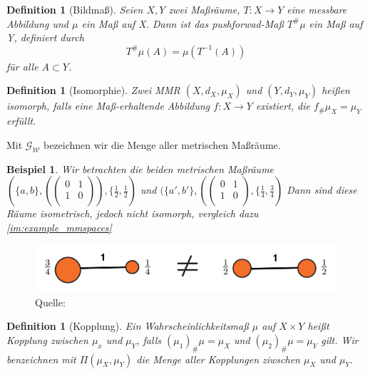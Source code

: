 \documentclass[11pt,a4paper]{article}
\newcommand{\source}[1]{\caption*{\hfill Quelle: {#1}} }
\newtheorem{definition}[theorem]{Definition}
\newtheorem{example}[theorem]{Beispiel}
\numberwithin{equation}{section}
\begin{document}
	\begin{definition}[Bildmaß]
		Seien $X,Y$ zwei Maßräume, $T: X \to Y$ eine messbare Abbildung und $\mu$ ein Maß auf X. Dann ist das pushforwad-Maß $T^\# \mu $ ein Maß auf Y, definiert durch \begin{equation}
		T^\# \mu (A) = \mu (T^{-1}(A))
		\end{equation}
		für alle $A \subset Y$.
	\end{definition}

	\begin{definition}[Isomorphie]
		Zwei MMR $(X,d_X,\mu_X)$ und $(Y,d_Y,\mu_Y)$ heißen isomorph, falls eine Maß-erhaltende Abbildung $f:X \to Y$ existiert, die $f_\#\mu_X = \mu_Y$ erfüllt.
	\end{definition}
	
	Mit $\mathcal{G}_\mathcal{W}$ bezeichnen wir die Menge aller metrischen Maßräume.
	
	\begin{example}
		Wir betrachten die beiden metrischen Maßräume $(\lbrace a,b \rbrace, (\begin{pmatrix}
		0 & 1\\
		1 & 0 \\
		\end{pmatrix}), \lbrace \frac{1}{2},\frac{1}{2})$ und 
		$(\lbrace a',b' \rbrace, (
		\begin{pmatrix}
		0 & 1\\
		1 & 0 \\
		\end{pmatrix}, \lbrace \frac{1}{4},\frac{3}{4})$
		Dann sind diese Räume isometrisch, jedoch nicht isomorph, vergleich dazu \autoref{im:example_mmspaces}
	\end{example}
	
	\begin{figure}[ht]
		\centering
		\includegraphics[width=0.3\textheight]{example_mmspaces.png}
		\caption[Beispiel isometrischer metrischer Maßräume]{Die beiden metrischen Maßräume sind ismetrisch, aber nicht isomorph.}
		\source{\cite{COTcuturi}}
		\label{im:example_mmspaces}
	\end{figure}
	
	
	\begin{definition}[Kopplung]
		Ein Wahrscheinlichkeitsmaß $\mu$ auf $X \times Y$ heißt Kopplung zwischen $\mu_x$ und $\mu_Y$, falls $(\mu_1)_\#\mu = \mu_X$ und $(\mu_2)_\#\mu = \mu_Y$ gilt. Wir benzeichnen mit $\Pi(\mu_X,\mu_Y)$ die Menge aller Kopplungen ziwschen $\mu_X$ und $\mu_Y$.
	\end{definition}
	
\end{document}
